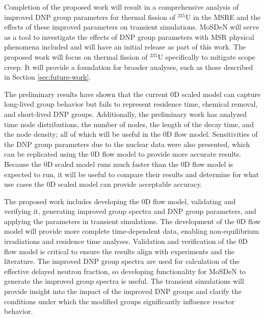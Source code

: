 Completion of the proposed work will result in a comprehensive analysis of improved \gls{DNP} group parameters for thermal fission of $^{235}$U in the \gls{MSRE} and the effects of these improved parameters on transient simulations.
\Gls{MoSDeN} will serve as a tool to investigate the effects of \gls{DNP} group parameters with \gls{MSR} physical phenomena included and will have an initial release as part of this work.
The proposed work will focus on thermal fission of $^{235}$U specifically to mitigate scope creep.
It will provide a foundation for broader analyses, such as those described in Section \ref{sec:future-work}.

The preliminary results have shown that the current 0D scaled model can capture long-lived group behavior but fails to represent residence time, chemical removal, and short-lived \gls{DNP} groups.
Additionally, the preliminary work has analyzed time node distributions, the number of nodes, the length of the decay time, and the node density; all of which will be useful in the 0D flow model.
Sensitivities of the \gls{DNP} group parameters due to the nuclear data were also presented, which can be replicated using the 0D flow model to provide more accurate results.
Because the 0D scaled model runs much faster than the 0D flow model is expected to run, it will be useful to compare their results and determine for what use cases the 0D scaled model can provide acceptable accuracy.

The proposed work includes developing the 0D flow model, validating and verifying it, generating improved group spectra and \gls{DNP} group parameters, and applying the parameters in transient simulations.
The development of the 0D flow model will provide more complete time-dependent data, enabling non-equilibrium irradiations and residence time analyses.
Validation and verification of the 0D flow model is critical to ensure the results align with experiments and the literature.
The improved \gls{DNP} group spectra are used for calculation of the effective delayed neutron fraction, so developing functionality for \gls{MoSDeN} to generate the improved group spectra is useful.
The transient simulations will provide insight into the impact of the improved \gls{DNP} groups and clarify the conditions under which the modified groups significantly influence reactor behavior.

